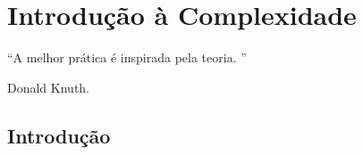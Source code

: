\chapter{Introdução à Complexidade}\label{cap:IntroducaoComplexidade}


\epigraph{``A melhor prática é inspirada pela teoria. ''}{Donald Knuth.}

\section{Introdução}
